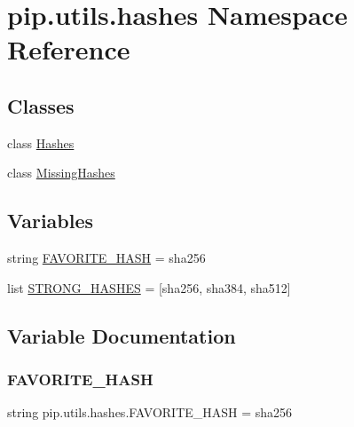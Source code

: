 \hypertarget{namespacepip_1_1utils_1_1hashes}{}\section{pip.\+utils.\+hashes Namespace Reference}
\label{namespacepip_1_1utils_1_1hashes}
\subsection*{Classes}
\begin{DoxyCompactItemize}
\item 
class \hyperlink{classpip_1_1utils_1_1hashes_1_1_hashes}{Hashes}
\item 
class \hyperlink{classpip_1_1utils_1_1hashes_1_1_missing_hashes}{Missing\+Hashes}
\end{DoxyCompactItemize}
\subsection*{Variables}
\begin{DoxyCompactItemize}
\item 
string \hyperlink{namespacepip_1_1utils_1_1hashes_a046b8698ecd907eb2f69381a324d9fde}{F\+A\+V\+O\+R\+I\+T\+E\+\_\+\+H\+A\+SH} = \textquotesingle{}sha256\textquotesingle{}
\item 
list \hyperlink{namespacepip_1_1utils_1_1hashes_a69a83c30bfffdb8e6ecba66e69bbfae7}{S\+T\+R\+O\+N\+G\+\_\+\+H\+A\+S\+H\+ES} = \mbox{[}\textquotesingle{}sha256\textquotesingle{}, \textquotesingle{}sha384\textquotesingle{}, \textquotesingle{}sha512\textquotesingle{}\mbox{]}
\end{DoxyCompactItemize}


\subsection{Variable Documentation}
\mbox{\label{namespacepip_1_1utils_1_1hashes_a046b8698ecd907eb2f69381a324d9fde}} 
\subsubsection{\texorpdfstring{F\+A\+V\+O\+R\+I\+T\+E\+\_\+\+H\+A\+SH}{FAVORITE\_HASH}}
{\footnotesize\ttfamily string pip.\+utils.\+hashes.\+F\+A\+V\+O\+R\+I\+T\+E\+\_\+\+H\+A\+SH = \textquotesingle{}sha256\textquotesingle{}}

